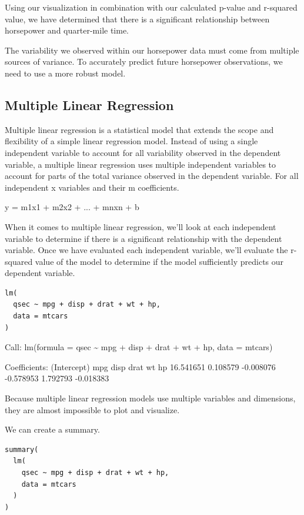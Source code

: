 \documentclass[11pt]{article}
\begin{document}
Using our visualization in combination with our calculated p-value and r-squared value, we have determined that there is a significant relationship between horsepower and quarter-mile time.

The variability we observed within our horsepower data must come from multiple sources of variance. To accurately predict future horsepower observations, we need to use a more robust model.

\subsection{Multiple Linear Regression}
\label{sec:org7a0c4d4}

Multiple linear regression is a statistical model that extends the scope and flexibility of a simple linear regression model. Instead of using a single independent variable to account for all variability observed in the dependent variable, a multiple linear regression uses multiple independent variables to account for parts of the total variance observed in the dependent variable. For all independent x variables and their m coefficients.

y = m1x1 + m2x2 + ... + mnxn + b

When it comes to multiple linear regression, we'll look at each independent variable to determine if there is a significant relationship with the dependent variable. Once we have evaluated each independent variable, we'll evaluate the r-squared value of the model to determine if the model sufficiently predicts our dependent variable.

\begin{verbatim}
lm(
  qsec ~ mpg + disp + drat + wt + hp,
  data = mtcars
)
\end{verbatim}

\begin{org}


Call:
lm(formula = qsec \textasciitilde{} mpg + disp + drat + wt + hp, data = mtcars)

Coefficients:
(Intercept)          mpg         disp         drat           wt           hp  
  16.541651     0.108579    -0.008076    -0.578953     1.792793    -0.018383
\end{org}

Because multiple linear regression models use multiple variables and dimensions, they are almost impossible to plot and visualize.

We can create a summary.

\begin{verbatim}
summary(
  lm(
    qsec ~ mpg + disp + drat + wt + hp,
    data = mtcars
  )
)
\end{verbatim}
\end{document}
